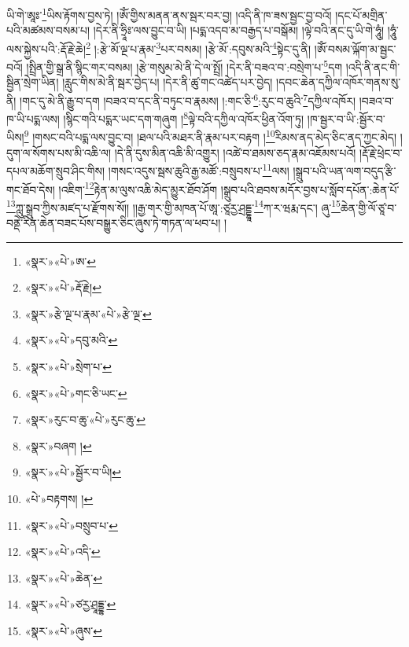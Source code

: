 ཡི་གེ་ཨཱཿ་\footnote{«སྣར་»«པེ་»ཨ་}ཡིས་རྟོགས་བྱས་ཏེ། །ཨོཾ་གྱིས་མནན་ནས་སྦར་བར་བྱ། །འདི་ནི་ཁ་ཟས་སྦྱང་བྱ་བའོ། །དང་པོ་མགྲིན་པའི་མཚམས་བསམ་པ། །དེར་ནི་ཧྲཱིཿ་ལས་བྱུང་བ་ཡི། །པདྨ་འདབ་མ་བརྒྱད་པ་བསྒོམ། །ལྟེ་བའི་ནང་དུ་ཡི་གེ་ཧཱུཾ། །ཧཱུཾ་ལས་སྐྱེས་པའི་:རྡོ་རྗེ་ཆེ།\footnote{«སྣར་»«པེ་»རྡོ་རྗེ།} །:རྩེ་མོ་ལྔ་པ་རྣམ་\footnote{«སྣར་»རྩེ་ལྔ་པ་རྣམ་«པེ་»རྩེ་ལྔ་}པར་བསམ། །རྩེ་མོ་:དབུས་མའི་\footnote{«སྣར་»«པེ་»དབུ་མའི་}སྟེང་དུ་ནི། །ཨོཾ་བསམ་ལྐོག་མ་སྦྱང་བའོ། །སྤྲིན་གྱི་སྒྲ་ནི་སྙིང་གར་བསམ། །རྩེ་གསུམ་མེ་ནི་དེ་ལ་སྤྲོ། །དེར་ནི་བཟའ་བ་:བསྲེག་པ་\footnote{«སྣར་»«པེ་»སྲེག་པ་}དག །འདི་ནི་ནང་གི་སྦྱིན་སྲེག་ཡིན། །རླུང་གིས་མེ་ནི་སྦར་བྱེད་པ། །དེར་ནི་ཚུ་གང་འཚེད་པར་བྱེད། །དབང་ཆེན་དཀྱིལ་འཁོར་གནས་སུ་ནི། །གང་དུ་མེ་ནི་རྒྱུ་བ་དག །བཟའ་བ་དང་ནི་བཏུང་བ་རྣམས། །:གང་ཅི་\footnote{«སྣར་»«པེ་»གང་ཅི་ཡང་}:རུང་བ་ཆུའི་\footnote{«སྣར་»རུང་བ་ཆུ་«པེ་»རུང་ཆུ་}དཀྱིལ་འཁོར། །བཟའ་བ་ཁ་ཡི་པདྨ་ལས། །སྙིང་གའི་པདྨར་ཡང་དག་གཞུག །\footnote{«སྣར་»བཞག །}ལྟེ་བའི་དཀྱིལ་འཁོར་ཕྱིན་འོག་ཏུ། །ཁ་སྦྱར་བ་ཡི་:སྦྱོར་བ་ཡིས།\footnote{«སྣར་»«པེ་»སྦྱོར་བ་ཡི།} །གསང་བའི་པདྨ་ལས་བྱུང་བ། །ཐལ་པའི་མཐར་ནི་རྣམ་པར་བརྟག །\footnote{«པེ་»བརྟགས། །}རིམས་ནད་མེད་ཅིང་ནད་ཀྱང་མེད། །དུག་ལ་སོགས་པས་མི་འཆི་ལ། །དེ་ནི་དུས་མིན་འཆི་མི་འགྱུར། །འཚེ་བ་ཐམས་ཅད་རྣམ་འཇོམས་པའོ། །རྡོ་རྗེ་ཕྲེང་བ་དཔལ་མཆོག་སྲུབ་ཤིང་གིས། །གསང་འདུས་སྦས་ཆུའི་རྒྱ་མཚོ་:བསྲུབས་པ་\footnote{«སྣར་»«པེ་»བསྲུབ་པ་}ལས། །སྒྲུབ་པའི་ཡན་ལག་བདུད་རྩི་གང་ཐོབ་དེས། །འཇིག་\footnote{«སྣར་»«པེ་»འདི་}རྟེན་མ་ལུས་འཆི་མེད་མྱུར་ཐོབ་ཤོག །སྒྲུབ་པའི་ཐབས་མདོར་བྱས་པ་སློབ་དཔོན་:ཆེན་པོ་\footnote{«སྣར་»«པེ་»ཆེན་}ཀླུ་སྒྲུབ་ཀྱིས་མཛད་པ་རྫོགས་སོ།། །།རྒྱ་གར་གྱི་མཁན་པོ་ཨཱ་:ཙཱརྱ་ཤྲདྡྷཱ་\footnote{«སྣར་»«པེ་»ཙརྱ་ཤྲཱདྡྷ་}ཀ་ར་ཝརྨ་དང་། ཞུ་\footnote{«སྣར་»«པེ་»ཞུས་}ཆེན་གྱི་ལོ་ཙཱ་བ་བནྡེ་རིན་ཆེན་བཟང་པོས་བསྒྱུར་ཅིང་ཞུས་ཏེ་གཏན་ལ་ཕབ་པ། ། 
